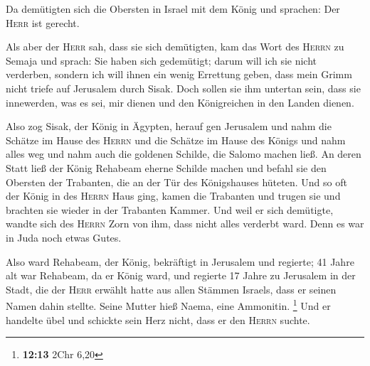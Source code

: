  Da demütigten sich die Obersten in Israel mit dem König
und sprachen: Der \textsc{Herr} ist gerecht.

 Als aber der \textsc{Herr} sah, dass sie sich demütigten,
kam das Wort des \textsc{Herrn} zu Semaja und sprach: Sie haben sich
gedemütigt; darum will ich sie nicht verderben, sondern ich will ihnen
ein wenig Errettung geben, dass mein Grimm nicht triefe auf Jerusalem
durch Sisak.  Doch sollen sie ihm untertan sein, dass sie
innewerden, was es sei, mir dienen und den Königreichen in den Landen
dienen.

 Also zog Sisak, der König in Ägypten, herauf gen
Jerusalem und nahm die Schätze im Hause des \textsc{Herrn} und die
Schätze im Hause des Königs und nahm alles weg und nahm auch die
goldenen Schilde, die Salomo machen ließ.  An deren Statt
ließ der König Rehabeam eherne Schilde machen und befahl sie den
Obersten der Trabanten, die an der Tür des Königshauses hüteten.
 Und so oft der König in des \textsc{Herrn} Haus ging,
kamen die Trabanten und trugen sie und brachten sie wieder in der
Trabanten Kammer.  Und weil er sich demütigte, wandte
sich des \textsc{Herrn} Zorn von ihm, dass nicht alles verderbt ward.
Denn es war in Juda noch etwas Gutes.

 Also ward Rehabeam, der König, bekräftigt in Jerusalem
und regierte; 41 Jahre alt war Rehabeam, da er König ward, und regierte
17 Jahre zu Jerusalem in der Stadt, die der \textsc{Herr} erwählt hatte
aus allen Stämmen Israels, dass er seinen Namen dahin stellte. Seine
Mutter hieß Naema, eine Ammonitin. \footnote{\textbf{12:13} 2Chr 6,20}
 Und er handelte übel und schickte sein Herz nicht, dass
er den \textsc{Herrn} suchte.

